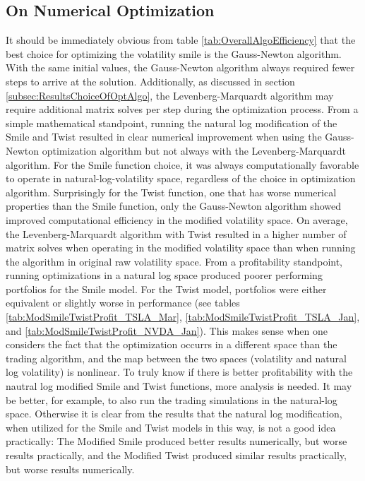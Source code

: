 \documentclass[12pt, a4paper, notitlepage]{article}
\numberwithin{equation}{subsection}
\numberwithin{figure}{subsection}
\numberwithin{table}{subsection}
\newcommand{\newpar}{\newline \newline}
\begin{document}
\subsection{On Numerical Optimization}
It should be immediately obvious from table \ref{tab:OverallAlgoEfficiency} that the best choice for optimizing the volatility smile is the Gauss-Newton algorithm.  With the same initial values, the Gauss-Newton algorithm always required fewer steps to arrive at the solution.  Additionally, as discussed in section \ref{subsec:ResultsChoiceOfOptAlgo}, the Levenberg-Marquardt algorithm may require additional matrix solves per step during the optimization process.
\newpar
From a simple mathematical standpoint, running the natural log modification of the Smile and Twist resulted in clear numerical improvement when using the Gauss-Newton optimization algorithm but not always with the Levenberg-Marquardt algorithm.  For the Smile function choice, it was always computationally favorable to operate in natural-log-volatility space, regardless of the choice in optimization algorithm.  Surprisingly for the Twist function, one that has worse numerical properties than the Smile function, only the Gauss-Newton algorithm showed improved computational efficiency in the modified volatility space.  On average, the Levenberg-Marquardt algorithm with Twist resulted in a higher number of matrix solves when operating in the modified volatility space than when running the algorithm in original raw volatility space.
\newpar
From a profitability standpoint, running optimizations in a natural log space produced poorer performing portfolios for the Smile model.  For the Twist model, portfolios were either equivalent or slightly worse in performance (see tables \ref{tab:ModSmileTwistProfit_TSLA_Mar}, \ref{tab:ModSmileTwistProfit_TSLA_Jan}, and \ref{tab:ModSmileTwistProfit_NVDA_Jan}).  This makes sense when one considers the fact that the optimization occurrs in a different space than the trading algorithm, and the map between the two spaces (volatility and natural log volatility) is nonlinear.
\newpar
To truly know if there is better profitability with the nautral log modified Smile and Twist functions, more analysis is needed.  It may be better, for example, to also run the trading simulations in the natural-log space.  Otherwise it is clear from the results that the natural log modification, when utilized for the Smile and Twist models in this way, is not a good idea practically:  The Modified Smile produced better results numerically, but worse results practically, and the Modified Twist produced similar results practically, but worse results numerically.
\end{document}
